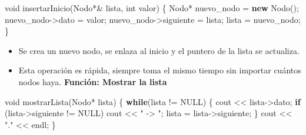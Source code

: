 \documentclass[
  11pt,
  a4paper,
  DIV=11,
  numbers=noendperiod]{scrreprt}
\newenvironment{Shaded}{\begin{snugshade}}{\end{snugshade}}
\newcommand{\ControlFlowTok}[1]{\textcolor[rgb]{0.00,0.23,0.31}{\textbf{#1}}}
\newcommand{\DataTypeTok}[1]{\textcolor[rgb]{0.68,0.00,0.00}{#1}}
\newcommand{\KeywordTok}[1]{\textcolor[rgb]{0.00,0.23,0.31}{\textbf{#1}}}
\newcommand{\NormalTok}[1]{\textcolor[rgb]{0.00,0.23,0.31}{#1}}
\newcommand{\OperatorTok}[1]{\textcolor[rgb]{0.37,0.37,0.37}{#1}}
\newcommand{\StringTok}[1]{\textcolor[rgb]{0.13,0.47,0.30}{#1}}
\providecommand{\tightlist}{%
  \setlength{\itemsep}{0pt}\setlength{\parskip}{0pt}}
\begin{document}
\begin{Shaded}
\begin{Highlighting}[]
\DataTypeTok{void}\NormalTok{ insertarInicio}\OperatorTok{(}\NormalTok{Nodo}\OperatorTok{*\&}\NormalTok{ lista}\OperatorTok{,} \DataTypeTok{int}\NormalTok{ valor}\OperatorTok{)} \OperatorTok{\{}
\NormalTok{    Nodo}\OperatorTok{*}\NormalTok{ nuevo\_nodo }\OperatorTok{=} \KeywordTok{new}\NormalTok{ Nodo}\OperatorTok{();}
\NormalTok{    nuevo\_nodo}\OperatorTok{{-}\textgreater{}}\NormalTok{dato }\OperatorTok{=}\NormalTok{ valor}\OperatorTok{;}
\NormalTok{    nuevo\_nodo}\OperatorTok{{-}\textgreater{}}\NormalTok{siguiente }\OperatorTok{=}\NormalTok{ lista}\OperatorTok{;}
\NormalTok{    lista }\OperatorTok{=}\NormalTok{ nuevo\_nodo}\OperatorTok{;}
\OperatorTok{\}}
\end{Highlighting}
\end{Shaded}

\begin{itemize}
\tightlist
\item
  Se crea un nuevo nodo, se enlaza al inicio y el puntero de la lista se
  actualiza.
\item
  Esta operación es rápida, siempre toma el mismo tiempo sin importar
  cuántos nodos haya. \textbf{Función: Mostrar la lista}
\end{itemize}

\begin{Shaded}
\begin{Highlighting}[]
\DataTypeTok{void}\NormalTok{ mostrarLista}\OperatorTok{(}\NormalTok{Nodo}\OperatorTok{*}\NormalTok{ lista}\OperatorTok{)} \OperatorTok{\{}
    \ControlFlowTok{while}\OperatorTok{(}\NormalTok{lista }\OperatorTok{!=}\NormalTok{ NULL}\OperatorTok{)} \OperatorTok{\{}
\NormalTok{        cout }\OperatorTok{\textless{}\textless{}}\NormalTok{ lista}\OperatorTok{{-}\textgreater{}}\NormalTok{dato}\OperatorTok{;}
        \ControlFlowTok{if} \OperatorTok{(}\NormalTok{lista}\OperatorTok{{-}\textgreater{}}\NormalTok{siguiente }\OperatorTok{!=}\NormalTok{ NULL}\OperatorTok{)}
\NormalTok{            cout }\OperatorTok{\textless{}\textless{}} \StringTok{" {-}\textgreater{} "}\OperatorTok{;}
\NormalTok{        lista }\OperatorTok{=}\NormalTok{ lista}\OperatorTok{{-}\textgreater{}}\NormalTok{siguiente}\OperatorTok{;}
    \OperatorTok{\}}
\NormalTok{    cout }\OperatorTok{\textless{}\textless{}} \StringTok{"."} \OperatorTok{\textless{}\textless{}}\NormalTok{ endl}\OperatorTok{;}
\OperatorTok{\}}
\end{Highlighting}
\end{Shaded}
\end{document}
